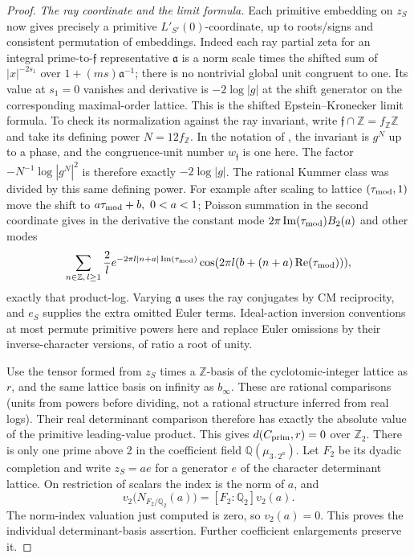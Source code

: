 \begin{proof}
\par\smallskip
\emph{The ray coordinate and the limit formula.}  Each primitive embedding on
\(z_S\) now gives precisely a primitive \(L'_{S'}(0)\)-coordinate, up to
roots/signs and consistent permutation of embeddings. Indeed each ray partial
zeta for an integral prime-to-\(\mathfrak f\) representative \(\mathfrak a\)
is a norm scale times the shifted sum of \(|x|^{-2s_1}\) over \(1+(m
s)\mathfrak a^{-1}\); there is no nontrivial global unit congruent to one. Its
value at \(s_1=0\) vanishes and derivative is \(-2\log|g|\) at the shift
generator on the corresponding maximal-order lattice. This is the shifted
Epstein--Kronecker limit formula.  To check its
normalization against the ray invariant, write \(\mathfrak f\cap\mathbb Z=f_{\mathbb Z}\mathbb Z\) and take its defining power
\(N=12f_{\mathbb Z}\).  In the notation of
\cite[Section~2.2 and Equation~(2.4)]{Oukhaba03}, the invariant is
\(g^N\) up to a phase, and the congruence-unit number
\(w_{\mathfrak f}\) is one here.  The factor
\(-N^{-1}\log|g^N|^2\) is therefore exactly \(-2\log|g|\).
The rational Kummer class was divided by this same defining power. For example
after scaling to lattice \((\tau_{\rm mod},1)\) move the shift to \(a\tau_{\rm
mod}+b,\ 0<a<1\); Poisson summation in the second coordinate gives in the
derivative the constant mode \(2\pi\operatorname{Im}(\tau_{\rm mod})B_2(a)\)
and other modes
\[
  \sum_{n\in\mathbb Z,\,l\ge1}
    \frac2l e^{-2\pi l|n+a|\operatorname{Im}(\tau_{\rm mod})}
                  \cos(2\pi l(b+(n+a)\operatorname{Re}(\tau_{\rm mod}))),
\]
exactly that product-log. Varying \(\mathfrak a\) uses the ray conjugates by
CM reciprocity, and \(e_S\) supplies the extra omitted Euler terms.
Ideal-action inversion conventions at most permute primitive powers here and
replace Euler omissions by their inverse-character versions, of ratio a root
of unity.

Use the tensor formed from \(z_S\) times a \(\mathbb Z\)-basis of the
cyclotomic-integer lattice as \(r\), and the same lattice basis on infinity as
\(b_\infty\). These are rational comparisons (units from powers before
dividing, not a rational structure inferred from real logs). Their real
determinant comparison therefore has exactly the absolute value of the
primitive leading-value product. This gives \(d(C_{\rm prim},r)=0\) over
\(\mathbb Z_2\). There is only one prime above 2 in the coefficient field
\(\mathbb Q(\mu_{3\cdot2^a})\). Let \(F_2\) be its dyadic
completion and write \(z_S=a e\) for a generator \(e\) of the
character determinant lattice. On restriction of scalars the index
is the norm of \(a\), and
\[
 v_2\bigl(N_{F_2/\mathbb Q_2}(a)\bigr)
                  =[F_2:\mathbb Q_2]v_2(a).
\]
The norm-index valuation just computed is zero, so \(v_2(a)=0\).
This proves the individual determinant-basis assertion. Further
coefficient enlargements preserve it.
\end{proof}

